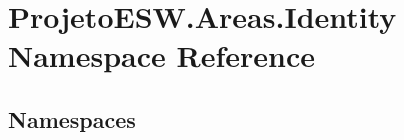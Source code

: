 \hypertarget{namespace_projeto_e_s_w_1_1_areas_1_1_identity}{}\section{Projeto\+E\+S\+W.\+Areas.\+Identity Namespace Reference}
\label{namespace_projeto_e_s_w_1_1_areas_1_1_identity}
\subsection*{Namespaces}
\begin{DoxyCompactItemize}
\end{DoxyCompactItemize}
